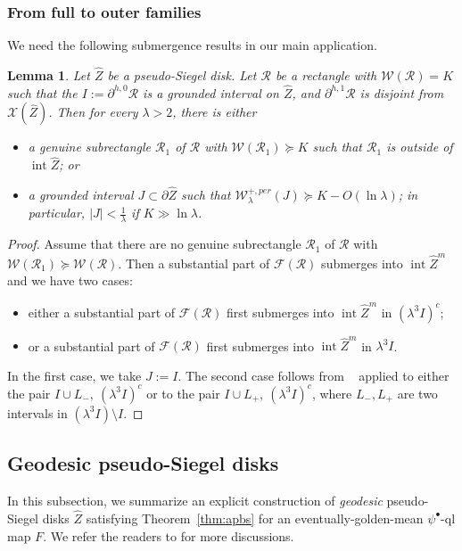 \documentclass[11pt, reqno]{amsart}
\numberwithin{equation}{section}
\theoremstyle{plain}
\theoremstyle{theorem}
\newtheorem{lem}[theorem]{Lemma}
\theoremstyle{plain}
\theoremstyle{definition}
\numberwithin{figure}{section}
\newcommand{\Fam}{{\mathcal F}}
\newcommand{\Width}{{\mathcal W}}
\newcommand\RR{\mathcal{R}}
\newcommand\XX{\mathcal{X}}
\newcommand\intr{\operatorname{int}}
\newcommand{\wZ}{{\widehat Z}}
\begin{document}
\subsubsection{From full to outer families}
We need the following submergence results in our main application.
\begin{lem}
\label{lem:rect loc}
Let $\wZ$ be a pseudo-Siegel disk.
Let $\RR$ be a rectangle with $\Width(\RR)=K$ such that the $I:= \partial^{h,0} \RR$ is a grounded interval on $\wZ$, and $\partial^{h,1} \RR$ is disjoint from $\XX(\wZ)$.
Then for every $\lambda>2$, there is either 
\begin{itemize}
    \item a genuine subrectangle  $\RR_1$ of $\RR$ with $\Width(\RR_1) \succeq K $ such that $\RR_1$ is outside of $\intr \wZ$; or   
    \item a grounded interval $J\subset \partial \wZ$ such that $\Width^{+, per}_\lambda(J) \succeq K - O(\ln \lambda)$; in particular,  $|J| < \frac{1}{\lambda}$ if $K\gg  \ln \lambda$.
\end{itemize}
\end{lem}
\begin{proof}
Assume that there are no genuine subrectangle $\RR_1$ of $\RR$ with $\Width(\RR_1)\succeq \Width(\RR)$. Then a substantial part of $\Fam(\RR)$ submerges into $\intr \wZ^m$ and we have two cases:
\begin{itemize}
    \item either a substantial part of $\Fam(\RR)$ first submerges into $\intr \wZ^m$ in $(\lambda^3 I)^c $;
    \item or a substantial part of $\Fam(\RR)$ first submerges into $\intr \wZ^m$ in $\lambda^3 I$.
\end{itemize}
In the first case, we take $J:= I$. The second case follows from ~\cite[Corrolary 6.2]{DL22} applied to either the pair $I\cup L_-,\ (\lambda^3I)^c$ or to the pair  $I\cup L_+,\ (\lambda^3I)^c$, where $L_-, L_+$ are two intervals in $(\lambda^3I)\setminus I$.
\end{proof}


\subsection{Geodesic pseudo-Siegel disks} \label{ss:good:wZ} In this subsection, we summarize an explicit construction of \emph{geodesic} pseudo-Siegel disks $\wZ$ satisfying Theorem~\ref{thm:apbs} for an eventually-golden-mean $\psi^\bullet$-ql map $F$. We refer the readers to \cite[\S7 and Theorem 7.5]{DLL25} for more discussions.
\end{document}
